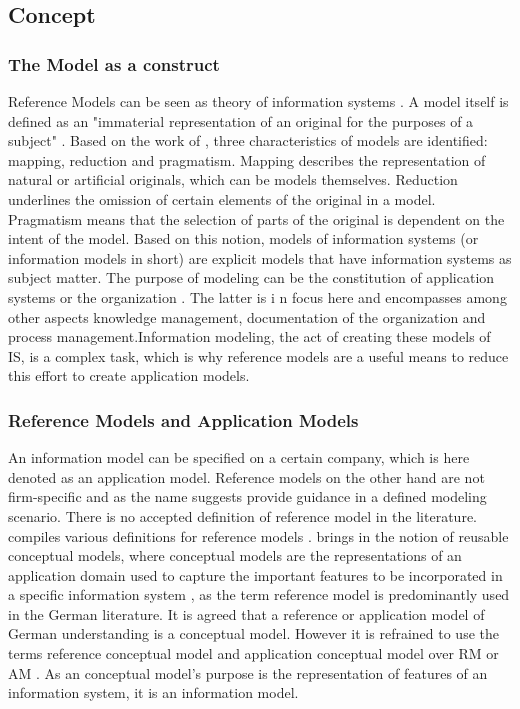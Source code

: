		\subsection{Concept}
		
		\subsubsection{The Model as a construct}
		
		
		Reference Models can be seen as theory of information systems \citep{Schutte1998}. A model itself is defined as an "immaterial representation of an original for the purposes of a subject" \citep[]{Becker2012Gom}. Based on the work of \cite{Stachowiak1973}, three characteristics of models are identified: mapping, reduction and pragmatism. Mapping describes the representation of natural or artificial originals, which can be models themselves. Reduction underlines the omission of certain elements of the original in a model. Pragmatism means that the selection of parts of the original is dependent on the intent of the model. Based on this notion, models of information systems (or information models in short) are explicit models that have information systems as subject matter. The purpose of modeling can be the constitution of application systems or the organization \citep[]{Rosemann2012proc}. The latter is i n focus here and encompasses among other aspects knowledge management, documentation of the organization and process management.Information modeling, the act of creating these models of \acrshort{IS}, is a complex task, which is why reference models are a useful means to reduce this effort \citep{Becker2007} to create application models.
		 
			\subsubsection{Reference Models and Application Models}
			An information model can be specified on a certain company, which is here denoted as an application model. Reference models on the other hand are not firm-specific and as the name suggests provide guidance in a defined modeling scenario. There is no accepted definition of reference model in the literature. \citeauthor{thomas2006a} compiles various definitions for reference models \citep{thomas2006a}. \citeauthor{vom2006reusable} brings in the notion of reusable conceptual models, where conceptual models are the representations of an application domain used to capture the important features to be incorporated in a specific information system \citep[]{vom2006reusable}, as the term reference model is predominantly used in the German literature. It is agreed that a reference or application model of German understanding is a conceptual model. However it is refrained to use the terms reference conceptual model and application conceptual model over \acrfull{RM} or \acrfull{AM} . As an conceptual model's purpose is the representation of features of an information system, it is an information model. 
			
